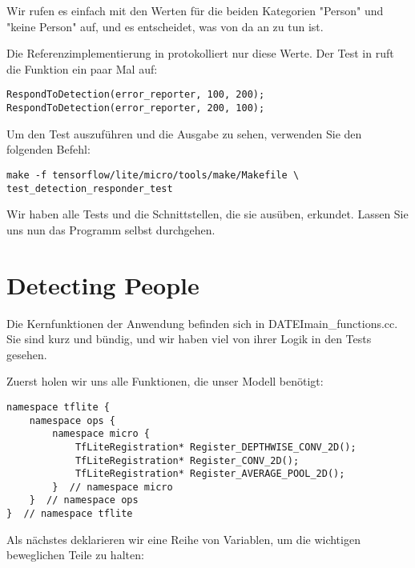 Wir rufen es einfach mit den Werten für die beiden Kategorien "Person" und "keine Person" auf, und es entscheidet, was von da an zu tun ist.

Die Referenzimplementierung in  protokolliert nur diese Werte. Der Test in  ruft die Funktion ein paar Mal auf:

\begin{code}
    \begin{lstlisting}
RespondToDetection(error_reporter, 100, 200);
RespondToDetection(error_reporter, 200, 100);
  \end{lstlisting}
\end{code}

Um den Test auszuführen und die Ausgabe zu sehen, verwenden Sie den folgenden Befehl:

\begin{code}
    \begin{lstlisting}
make -f tensorflow/lite/micro/tools/make/Makefile \
test_detection_responder_test
  \end{lstlisting}
\end{code}

Wir haben alle Tests und die Schnittstellen, die sie ausüben, erkundet. Lassen Sie uns nun das Programm selbst durchgehen.

\section{Detecting People}

Die Kernfunktionen der Anwendung befinden sich in DATEI{main\_functions.cc}. Sie sind kurz und bündig, und wir haben viel von ihrer Logik in den Tests gesehen.

Zuerst holen wir uns alle Funktionen, die unser Modell benötigt:

\begin{code}
    \begin{lstlisting}
namespace tflite {
    namespace ops {
        namespace micro {
            TfLiteRegistration* Register_DEPTHWISE_CONV_2D();
            TfLiteRegistration* Register_CONV_2D();
            TfLiteRegistration* Register_AVERAGE_POOL_2D();
        }  // namespace micro
    }  // namespace ops
}  // namespace tflite
  \end{lstlisting}
\end{code}

Als nächstes deklarieren wir eine Reihe von Variablen, um die wichtigen beweglichen Teile zu halten:

